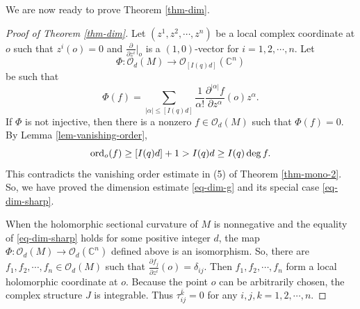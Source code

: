 \documentclass[12pt]{amsart}
\def\bk{{\bar k}}
\def\p{\partial}
\newcommand\C{{\mathbb C}}
\theoremstyle{definition}
\theoremstyle{remark}
\numberwithin{equation}{section}
\def\ord{{\rm ord}}
\begin{document}
We are now ready to prove Theorem \ref{thm-dim}.
\begin{proof}[Proof of Theorem \ref{thm-dim}]
Let $(z^1,z^2,\cdots,z^n)$ be a local complex coordinate at $o$ such that $z^i(o)=0$ and $\frac{\p}{\p z^i}\big|_o$ is a $(1,0)$-vector for $i=1,2,\cdots,n$.
Let $$\Phi:\mathcal O_d(M)\to \mathcal O_{[I(q)d]}(\C^n)$$ be such that $$\Phi(f)=\sum_{|\alpha|\leq [I(q)d]}\frac{1}{\alpha!}\frac{\p^{|\alpha|} f}{\p z^\alpha}(o)z^\alpha.$$
If $\Phi$ is not injective, then there is a nonzero $f\in \mathcal O_d(M)$ such that $\Phi(f)=0$. By Lemma \ref{lem-vanishing-order},
 $$\ord_o(f)\geq[I(q)d]+1>I(q)d\geq I(q)\deg f.$$
 This contradicts the vanishing order estimate in (5) of Theorem \ref{thm-mono-2}. So, we have proved the dimension estimate \eqref{eq-dim-g} and its special case \eqref{eq-dim-sharp}.

When the holomorphic sectional curvature of $M$ is nonnegative and the equality of \eqref{eq-dim-sharp} holds for some positive integer $d$, the map $\Phi:\mathcal O_d(M)\to \mathcal O_d(\C^n)$ defined above is an isomorphism. So, there are $f_1,f_2,\cdots,f_n\in\mathcal O_d(M)$ such that $\frac{\p f_j}{\p z^i}(o)=\delta_{ij}$. Then $f_1,f_2,\cdots,f_n$ form a local holomorphic coordinate at $o$. Because the point $o$ can be arbitrarily chosen, the complex structure $J$ is integrable. Thus $\tau_{ij}^\bk=0$ for any $i,j,k=1,2,\cdots,n$.


\end{proof}
\end{document}
